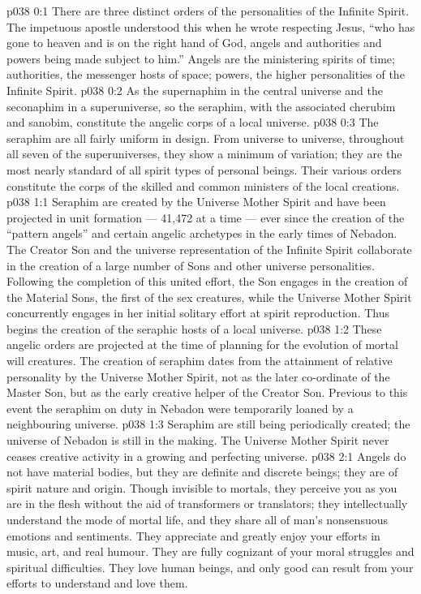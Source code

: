 \author{Melchizedek}
\vs p038 0:1 There are three distinct orders of the personalities of the Infinite Spirit. The impetuous apostle understood this when he wrote respecting Jesus, “who has gone to heaven and is on the right hand of God, angels and authorities and powers being made subject to him.” Angels are the ministering spirits of time; authorities, the messenger hosts of space; powers, the higher personalities of the Infinite Spirit.
\vs p038 0:2 \pc As the supernaphim in the central universe and the seconaphim in a superuniverse, so the seraphim, with the associated cherubim and sanobim, constitute the angelic corps of a local universe.
\vs p038 0:3 The seraphim are all fairly uniform in design. From universe to universe, throughout all seven of the superuniverses, they show a minimum of variation; they are the most nearly standard of all spirit types of personal beings. Their various orders constitute the corps of the skilled and common ministers of the local creations.
\vs p038 1:1 Seraphim are created by the Universe Mother Spirit and have been projected in unit formation --- 41,472 at a time --- ever since the creation of the “pattern angels” and certain angelic archetypes in the early times of Nebadon. The Creator Son and the universe representation of the Infinite Spirit collaborate in the creation of a large number of Sons and other universe personalities. Following the completion of this united effort, the Son engages in the creation of the Material Sons, the first of the sex creatures, while the Universe Mother Spirit concurrently engages in her initial solitary effort at spirit reproduction. Thus begins the creation of the seraphic hosts of a local universe.
\vs p038 1:2 These angelic orders are projected at the time of planning for the evolution of mortal will creatures. The creation of seraphim dates from the attainment of relative personality by the Universe Mother Spirit, not as the later co\hyp{}ordinate of the Master Son, but as the early creative helper of the Creator Son. Previous to this event the seraphim on duty in Nebadon were temporarily loaned by a neighbouring universe.
\vs p038 1:3 Seraphim are still being periodically created; the universe of Nebadon is still in the making. The Universe Mother Spirit never ceases creative activity in a growing and perfecting universe.
\vs p038 2:1 Angels do not have material bodies, but they are definite and discrete beings; they are of spirit nature and origin. Though invisible to mortals, they perceive you as you are in the flesh without the aid of transformers or translators; they intellectually understand the mode of mortal life, and they share all of man’s nonsensuous emotions and sentiments. They appreciate and greatly enjoy your efforts in music, art, and real humour. They are fully cognizant of your moral struggles and spiritual difficulties. They love human beings, and only good can result from your efforts to understand and love them.
